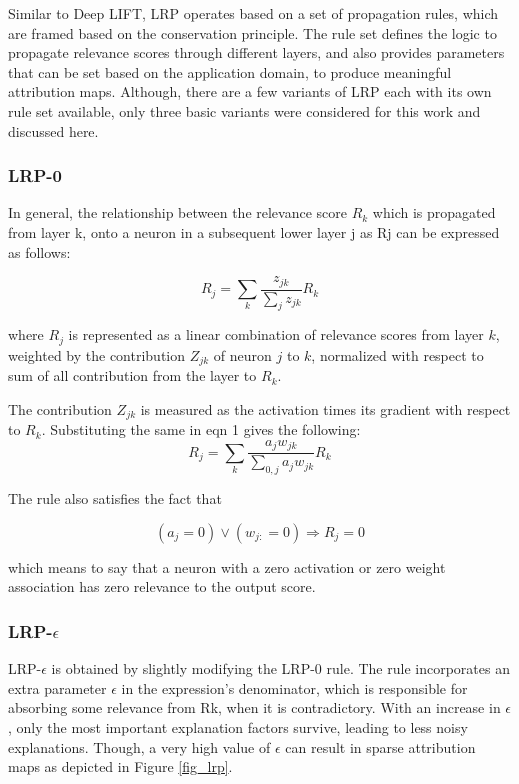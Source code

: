 \documentclass[../report.tex]{subfiles}
\begin{document}
Similar to Deep LIFT, LRP operates based on a set of propagation rules, which are framed based on the conservation principle. The rule set defines the logic to propagate relevance scores through different layers, and also provides parameters that can be set based on the application domain, to produce meaningful attribution maps. Although, there are a few variants of LRP each with its own rule set available, only three basic variants were considered for this work and discussed here.

\subsubsection{LRP-0}
In general,  the relationship between the relevance score $R_{k}$ which is propagated from layer k, onto a neuron in a subsequent lower layer j as Rj can be expressed as follows:

\begin{equation}
	R_j=\sum_k \frac{z_{j k}}{\sum_j z_{j k}} R_k
\end{equation}

where $R_j$ is represented as a linear combination of relevance scores from layer $k$, weighted by the  contribution $Z_{jk}$ of neuron $j$ to $k$, normalized with respect to sum of all contribution from the layer to $R_k$.

The contribution $Z_{jk}$ is measured as the activation times its gradient with respect to $R_k$. Substituting the same in eqn 1 gives the following:\\
\begin{equation}
	R_j=\sum_k \frac{a_j w_{j k}}{\sum_{0, j} a_j w_{j k}} R_k
\end{equation}


The rule also satisfies the fact that 

\begin{equation}
	\left(a_j=0\right) \vee\left(w_{j:}=0\right) \Rightarrow R_j=0
\end{equation}

which means to say that a neuron with a zero activation or zero weight association has zero relevance to the output score.

\subsubsection{LRP-$\epsilon$}

LRP-$\epsilon$ is obtained by slightly modifying the LRP-0 rule. The rule incorporates an extra parameter $\epsilon$ in the expression’s denominator, which is responsible for absorbing some relevance from Rk, when it is contradictory. With an increase in $\epsilon$, only the most important explanation factors survive, leading to less noisy explanations. Though, a very high value of $\epsilon$ can result in sparse attribution maps as depicted in Figure \ref{fig_lrp}.
\end{document}
